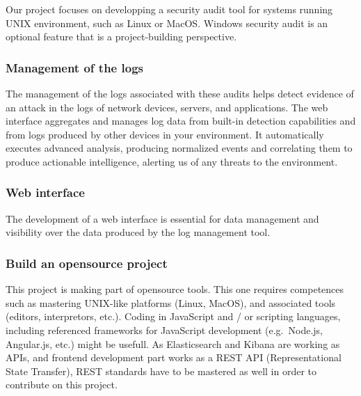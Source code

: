 Our project focuses on developping a security audit tool for systems running UNIX environment, such as Linux or MacOS.
Windows security audit is an optional feature that is a project-building perspective.

\vspace{0.5cm}
\subsubsection{Management of the logs}
The management of the logs associated with these audits helps detect evidence of an attack in the logs of network devices, servers, and applications. The web interface aggregates and manages log data from built-in detection capabilities and from logs produced by other devices in your environment. It automatically executes advanced analysis, producing normalized events and correlating them to produce actionable intelligence, alerting us of any threats to the environment.


\vspace{0.5cm}
\subsubsection{Web interface}
The development of a web interface is essential for data management and visibility over the data produced
by the log management tool.


\vspace{0.5cm}
\subsubsection{Build an opensource project}

This project is making part of opensource tools. This one requires competences such as mastering UNIX-like platforms (Linux, MacOS),
and associated tools (editors, interpretors, etc.).
Coding in JavaScript and / or scripting languages, including referenced
frameworks for JavaScript development (e.g.~Node.js, Angular.js, etc.) might be usefull.
As Elasticsearch and Kibana are working as APIs, and frontend development part works
as a REST API (Representational State Transfer), REST standards have to be mastered as well in order to contribute on this project.

\pagebreak

